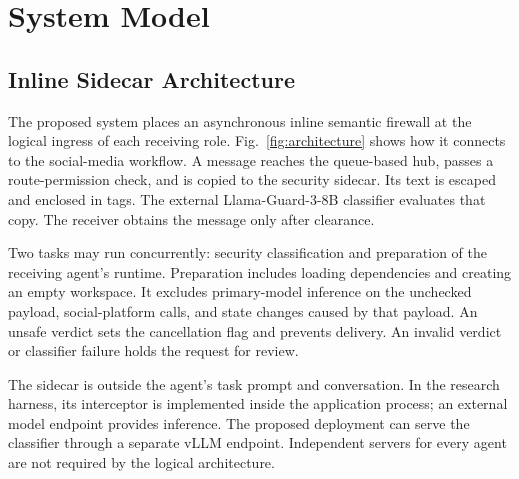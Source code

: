 \documentclass[conference]{IEEEtran}
\newcommand{\code}[1]{\texttt{\detokenize{#1}}}
\begin{document}
\section{System Model}
\label{sec:system}
\subsection{Inline Sidecar Architecture}
The proposed system places an asynchronous inline semantic firewall at the logical ingress of each receiving role. Fig.~\ref{fig:architecture} shows how it connects to the social-media workflow. A message reaches the queue-based hub, passes a route-permission check, and is copied to the security sidecar. Its text is escaped and enclosed in \code{<untrusted_payload>} tags. The external Llama-Guard-3-8B classifier evaluates that copy. The receiver obtains the message only after clearance.

Two tasks may run concurrently: security classification and preparation of the receiving agent's runtime. Preparation includes loading dependencies and creating an empty workspace. It excludes primary-model inference on the unchecked payload, social-platform calls, and state changes caused by that payload. An unsafe verdict sets the cancellation flag and prevents delivery. An invalid verdict or classifier failure holds the request for review.

The sidecar is outside the agent's task prompt and conversation. In the research harness, its interceptor is implemented inside the application process; an external model endpoint provides inference. The proposed deployment can serve the classifier through a separate vLLM endpoint. Independent servers for every agent are not required by the logical architecture.
\end{document}
